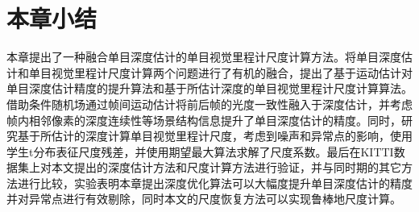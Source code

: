 \section{本章小结}
\label{sec:deepsr_conclusion}
本章提出了一种融合单目深度估计的单目视觉里程计尺度计算方法。将单目深度估计和单目视觉里程计尺度计算两个问题进行了有机的融合，提出了基于运动估计对单目深度估计精度的提升算法和基于所估计深度的单目视觉里程计尺度计算算法。借助条件随机场通过帧间运动估计将前后帧的光度一致性融入于深度估计，并考虑帧内相邻像素的深度连续性等场景结构信息提升了单目深度估计的精度。同时，研究基于所估计的深度计算单目视觉里程计尺度，考虑到噪声和异常点的影响，使用
学生t分布表征尺度残差，并使用期望最大算法求解了尺度系数。最后在KITTI数据集上对本文提出的深度估计方法和尺度计算方法进行验证，并与同时期的其它方法进行比较，实验表明本章提出深度优化算法可以大幅度提升单目深度估计的精度并对异常点进行有效剔除，同时本文的尺度恢复方法可以实现鲁棒地尺度计算。

